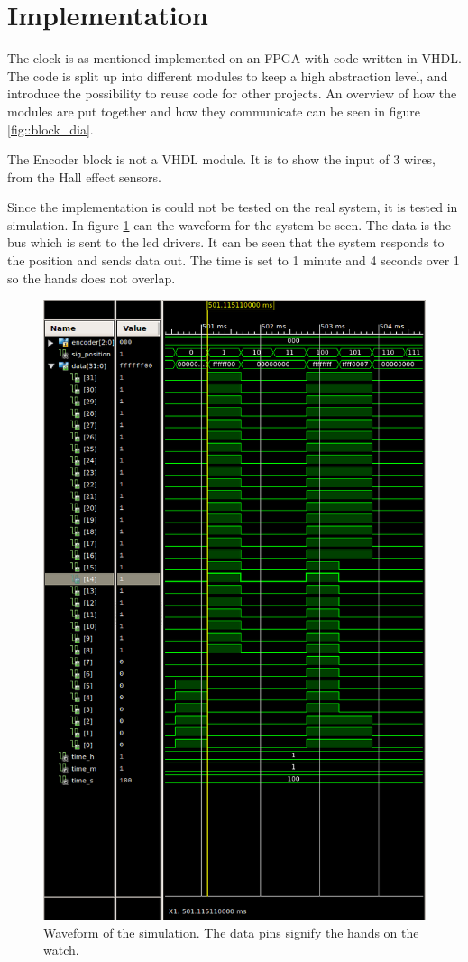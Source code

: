 \section{Implementation}
The clock is as mentioned implemented on an FPGA with code written in VHDL.
The code is split up into different modules to keep a high abstraction level, and introduce the possibility to reuse code for other projects.
An overview of how the modules are put together and how they communicate can be seen in figure \ref{fig::block_dia}.


The Encoder block is not a VHDL module.
It is to show the input of 3 wires, from the Hall effect sensors.

Since the implementation is could not be tested on the real system, it is tested in simulation.
In figure \ref{fig:simulation_wave} can the waveform for the system be seen.
The data is the bus which is sent to the led drivers.
It can be seen that the system responds to the position and sends data out.
The time is set to 1 minute and 4 seconds over 1 so the hands does not overlap.

\begin{figure}
 \centering
 \includegraphics[scale=0.7]{img/waveform}
 \caption[Waveform of the simulation.]{Waveform of the simulation. The data pins signify the hands on the watch.}
 \label{fig:simulation_wave}
\end{figure}
